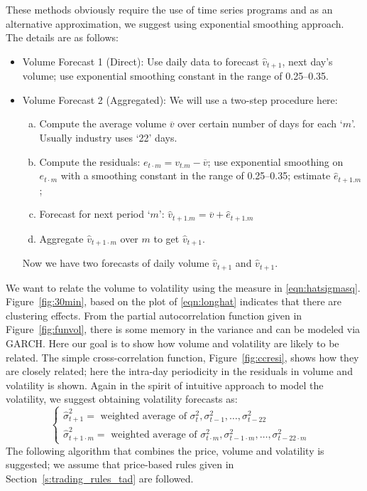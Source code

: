 	
These methods obviously require the use of time series programs and as an alternative approximation, we suggest using exponential smoothing approach. The details are as follows:
	\begin{itemize}
	\item Volume Forecast 1 (Direct): Use daily data to forecast $\hat{v}_{t+1}$, next day's volume; use exponential smoothing constant in the range of 0.25--0.35.
	\item Volume Forecast 2 (Aggregated): We will use a two-step procedure here:
		\begin{enumerate}[(a)]
		\item Compute the average volume $\overline{v}$ over certain number of days for each `$m$'. Usually industry uses `22' days.
		\item Compute the residuals: $e_{t\cdot m} = v_{t . m} - \overline{v}$; use exponential smoothing on $e_{t\cdot m}$ with a smoothing constant in the range of 0.25--0.35; estimate $\hat{e}_{t+1 . m}$;
		\item Forecast for next period `$m$': $\hat{v}_{t+1. m}=\overline{v}+\hat{e}_{t+1 . m}$
		\item Aggregate $\hat{v}_{t+1\cdot m}$ over $m$ to get $\hat{v}_{t+1}$. 
		\end{enumerate}
	Now we have two forecasts of daily volume $\hat{v}_{t+1}$ and $\hat{v}_{t+1}$.
	\end{itemize}
We want to relate the volume to volatility using the measure in \eqref{eqn:hatsigmasq}. Figure~\ref{fig:30min}, based on the plot of \eqref{eqn:longhat} indicates that there are clustering effects. From the partial autocorrelation function given in Figure~\ref{fig:funvol}, there is some memory in the variance and can be modeled via GARCH. Here our goal is to show how volume and volatility are likely to be related. The simple cross-correlation function, Figure~\ref{fig:ccresi}, shows how they are closely related; here the intra-day periodicity in the residuals in volume and volatility is shown. Again in the spirit of intuitive approach to model the volatility, we suggest obtaining volatility forecasts as:
	\[
	\begin{cases}
	\hat{\sigma}_{t+1}^2 = \text{ weighted average of } \sigma_t^2, \sigma_{t-1}^2, \ldots, \sigma_{t-22}^2 & \\
	\hat{\sigma}^2_{t+1 \cdot m}= \text{ weighted average of } \sigma_{t\cdot m}^2, \sigma_{t-1 \cdot m}^2, \ldots, \sigma_{t-22\cdot m}^2 & 
	\end{cases}
	\]
The following algorithm that combines the price, volume and volatility is suggested; we assume that price-based rules given in Section~\ref{s:trading_rules_tad} are followed.
